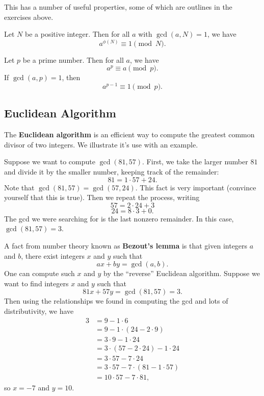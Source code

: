 \documentclass{article}
\begin{document}
        This has a number of useful properties, some of which are outlines in the exercises above.

        \begin{theorem}
            Let \(N\) be a positive integer.
            Then for all \(a\) with \(\gcd(a,N)=1\), we have
            \[a^{\phi(N)}\equiv 1\pmod{N}.\]
        \end{theorem}

        \begin{corollary}
            Let \(p\) be a prime number.
            Then for all \(a\), we have
            \[a^p\equiv a\pmod{p}.\]
            If \(\gcd(a,p)=1\), then 
            \[a^{p-1}\equiv 1\pmod{p}.\]
        \end{corollary}

    \subsection{Euclidean Algorithm}

        The \textbf{Euclidean algorithm} is an efficient way to compute the greatest common divisor of two integers.
        We illustrate it's use with an example.
        
        Suppose we want to compute \(\gcd(81,57)\).
        First, we take the larger number \(81\) and divide it by the smaller number, keeping track of the remainder:
        \[81 = 1\cdot 57 + 24.\]
        Note that \(\gcd(81,57)=\gcd(57,24)\).
        This fact is very important (convince yourself that this is true).
        Then we repeat the process, writing
        \[57 = 2\cdot 24 + 3\]
        \[24 = 8\cdot 3 + 0.\]
        The gcd we were searching for is the last nonzero remainder.
        In this case, \(\gcd(81,57) = 3\).

        A fact from number theory known as \textbf{Bezout's lemma} is that given integers \(a\) and \(b\), there exist integers \(x\) and \(y\) such that
        \[ax + by = \gcd(a,b).\]
        One can compute such \(x\) and \(y\) by the ``reverse'' Euclidean algorithm.
        Suppose we want to find integers \(x\) and \(y\) such that
        \[81x + 57y = \gcd(81,57) = 3.\]
        Then using the relationships we found in computing the gcd and lots of distributivity, we have
        \begin{align*}
            3 &= 9 - 1\cdot 6\\
            &= 9 - 1\cdot(24 - 2\cdot 9)\\
            &= 3\cdot 9 - 1\cdot 24\\
            &= 3\cdot(57 - 2\cdot 24) - 1\cdot 24\\ 
            &= 3\cdot 57 - 7\cdot 24\\
            &= 3\cdot 57 - 7\cdot (81 - 1\cdot 57)\\
            &= 10\cdot 57 - 7\cdot 81,
        \end{align*}
        so \(x = -7\) and \(y=10\).
\end{document}
